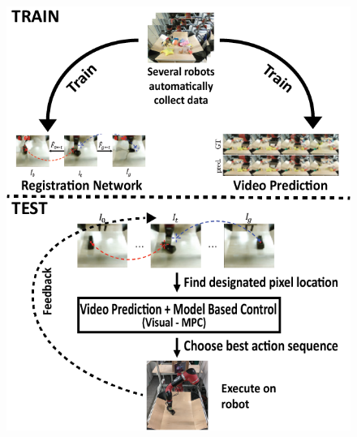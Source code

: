 
\begin{figure}[t]
\centering
\includegraphics[width=.8\columnwidth,trim={3.2mm 0 0 0},clip]{images_general/new_overview.png}
\caption{\small{}}
\label{fig:overview}
\end{figure}


